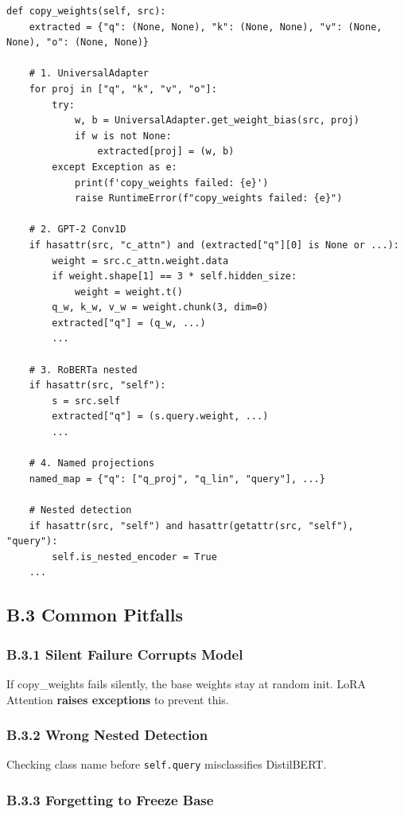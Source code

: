 \begin{lstlisting}
def copy_weights(self, src):
    extracted = {"q": (None, None), "k": (None, None), "v": (None, None), "o": (None, None)}
    
    # 1. UniversalAdapter
    for proj in ["q", "k", "v", "o"]:
        try:
            w, b = UniversalAdapter.get_weight_bias(src, proj)
            if w is not None:
                extracted[proj] = (w, b)
        except Exception as e:
            print(f'copy_weights failed: {e}')
            raise RuntimeError(f"copy_weights failed: {e}")
    
    # 2. GPT-2 Conv1D
    if hasattr(src, "c_attn") and (extracted["q"][0] is None or ...):
        weight = src.c_attn.weight.data
        if weight.shape[1] == 3 * self.hidden_size:
            weight = weight.t()
        q_w, k_w, v_w = weight.chunk(3, dim=0)
        extracted["q"] = (q_w, ...)
        ...
    
    # 3. RoBERTa nested
    if hasattr(src, "self"):
        s = src.self
        extracted["q"] = (s.query.weight, ...)
        ...
    
    # 4. Named projections
    named_map = {"q": ["q_proj", "q_lin", "query"], ...}
    
    # Nested detection
    if hasattr(src, "self") and hasattr(getattr(src, "self"), "query"):
        self.is_nested_encoder = True
    ...
\end{lstlisting}

\subsection{B.3 Common Pitfalls}

\subsubsection{B.3.1 Silent Failure Corrupts Model}

If copy\_weights fails silently, the base weights stay at random init. 
LoRA Attention \textbf{raises exceptions} to prevent this.

\subsubsection{B.3.2 Wrong Nested Detection}

Checking class name before \texttt{self.query} misclassifies DistilBERT.

\subsubsection{B.3.3 Forgetting to Freeze Base}

